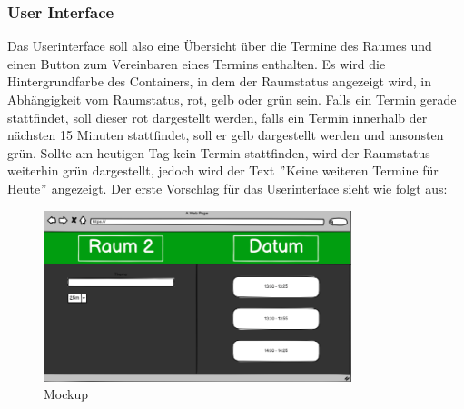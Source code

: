 \subsubsection{User Interface}\label{subsubsec:user-interface}
Das Userinterface soll also eine Übersicht über die Termine des Raumes und einen Button zum Vereinbaren eines Termins enthalten.
Es wird die Hintergrundfarbe des Containers, in dem der Raumstatus angezeigt wird, in Abhängigkeit vom Raumstatus, rot, gelb oder grün sein.
Falls ein Termin gerade stattfindet, soll dieser rot dargestellt werden, falls ein Termin innerhalb der nächsten 15 Minuten stattfindet, soll er gelb dargestellt werden und ansonsten grün.
Sollte am heutigen Tag kein Termin stattfinden, wird der Raumstatus weiterhin grün dargestellt, jedoch wird der Text \("\)Keine weiteren Termine für Heute\("\) angezeigt.
\newline
\newline
Der erste Vorschlag für das Userinterface sieht wie folgt aus:
\newline
\newline
\begin{figure}[h]
    \par\vspace{1cm}
    \centering
    \includegraphics[width=0.8\textwidth]{Bilder/mockup}
    \caption{Mockup}
    \label{fig:Mockup}
    \par\vspace{1cm}
\end{figure}
\justifying
\newline
\newline
